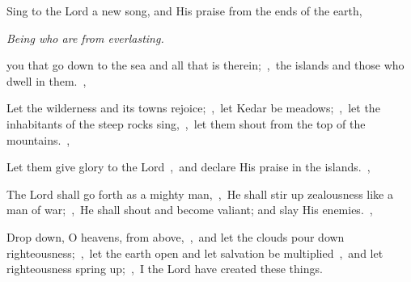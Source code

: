 \documentclass[12pt,twoside,a5paper]{article}
\begin{document}
\begin{normalparskip}
   Sing to the Lord a new song, and His praise from the ends of the earth,


   \emph{Being who are from everlasting.}

  you that go down to the sea and all that is therein;~\sep\ the islands and those who dwell in them.~\sep

  Let the wilderness and its towns rejoice;~\sep\ let Kedar be meadows;~\sep\ let the inhabitants of the steep rocks sing,~\sep\ let them shout from the top of the mountains.~\sep

  Let them give glory to the Lord~\sep\ and declare His praise in the islands.~\sep

  The Lord shall go forth as a mighty man,~\sep\ He shall stir up zealousness like a man of war;~\sep\ He shall shout and become valiant; and slay His enemies.~\sep

  Drop down, O heavens, from above,~\sep\ and let the clouds pour down righteousness;~\sep\ let the earth open and let salvation be multiplied~\sep\ and let righteousness spring up;~\sep\ I the Lord have created these things.
\end{normalparskip}


\end{document}
